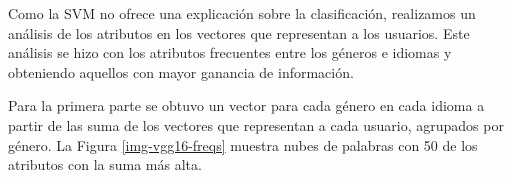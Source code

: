 \documentclass[runningheads]{llncs}
\begin{document}
Como la SVM no ofrece una explicación sobre la clasificación,
realizamos un análisis de los atributos en los vectores que representan 
a los usuarios.
Este análisis se hizo con los atributos 
frecuentes entre los géneros e idiomas y obteniendo aquellos
con mayor ganancia de información.

Para la primera parte se obtuvo un vector para cada género en cada idioma
a partir de las suma de los vectores que representan a cada usuario, agrupados
por género. La Figura \ref{img-vgg16-freqs} muestra nubes de palabras con 
50 de los atributos con la suma más alta.

\begin{figure}[h]
\centering
{}
\qquad
{}\\
\qquad

\end{figure}
\end{document}
